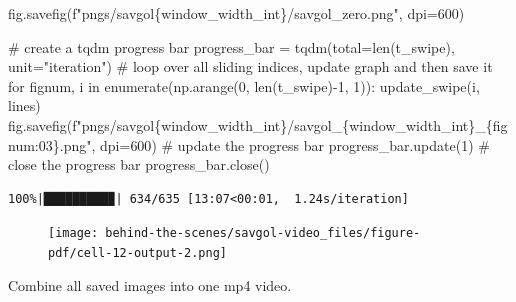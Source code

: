 \documentclass[
  letterpaper,
  DIV=11,
  numbers=noendperiod,
  oneside]{scrreprt}
\newenvironment{Shaded}{\begin{snugshade}}{\end{snugshade}}
\newcommand{\BuiltInTok}[1]{\textcolor[rgb]{0.00,0.23,0.31}{#1}}
\newcommand{\CommentTok}[1]{\textcolor[rgb]{0.37,0.37,0.37}{#1}}
\newcommand{\ControlFlowTok}[1]{\textcolor[rgb]{0.00,0.23,0.31}{#1}}
\newcommand{\DecValTok}[1]{\textcolor[rgb]{0.68,0.00,0.00}{#1}}
\newcommand{\KeywordTok}[1]{\textcolor[rgb]{0.00,0.23,0.31}{#1}}
\newcommand{\NormalTok}[1]{\textcolor[rgb]{0.00,0.23,0.31}{#1}}
\newcommand{\OperatorTok}[1]{\textcolor[rgb]{0.37,0.37,0.37}{#1}}
\newcommand{\SpecialCharTok}[1]{\textcolor[rgb]{0.37,0.37,0.37}{#1}}
\newcommand{\SpecialStringTok}[1]{\textcolor[rgb]{0.13,0.47,0.30}{#1}}
\newcommand{\StringTok}[1]{\textcolor[rgb]{0.13,0.47,0.30}{#1}}
\begin{document}
\begin{Shaded}
\begin{Highlighting}[]
\NormalTok{fig.savefig(}\SpecialStringTok{f"pngs/savgol}\SpecialCharTok{\{}\NormalTok{window\_width\_int}\SpecialCharTok{\}}\SpecialStringTok{/savgol\_zero.png"}\NormalTok{, dpi}\OperatorTok{=}\DecValTok{600}\NormalTok{)}

\CommentTok{\# create a tqdm progress bar}
\NormalTok{progress\_bar }\OperatorTok{=}\NormalTok{ tqdm(total}\OperatorTok{=}\BuiltInTok{len}\NormalTok{(t\_swipe), unit}\OperatorTok{=}\StringTok{"iteration"}\NormalTok{)}
\CommentTok{\# loop over all sliding indices, update graph and then save it}
\ControlFlowTok{for}\NormalTok{ fignum, i }\KeywordTok{in} \BuiltInTok{enumerate}\NormalTok{(np.arange(}\DecValTok{0}\NormalTok{, }\BuiltInTok{len}\NormalTok{(t\_swipe)}\OperatorTok{{-}}\DecValTok{1}\NormalTok{, }\DecValTok{1}\NormalTok{)):}
\NormalTok{    update\_swipe(i, lines)}
\NormalTok{    fig.savefig(}\SpecialStringTok{f"pngs/savgol}\SpecialCharTok{\{}\NormalTok{window\_width\_int}\SpecialCharTok{\}}\SpecialStringTok{/savgol\_}\SpecialCharTok{\{}\NormalTok{window\_width\_int}\SpecialCharTok{\}}\SpecialStringTok{\_}\SpecialCharTok{\{}\NormalTok{fignum}\SpecialCharTok{:03\}}\SpecialStringTok{.png"}\NormalTok{, dpi}\OperatorTok{=}\DecValTok{600}\NormalTok{)}
    \CommentTok{\# update the progress bar}
\NormalTok{    progress\_bar.update(}\DecValTok{1}\NormalTok{)}
\CommentTok{\# close the progress bar}
\NormalTok{progress\_bar.close()}
\end{Highlighting}
\end{Shaded}

\begin{verbatim}
100%|█████████▉| 634/635 [13:07<00:01,  1.24s/iteration]
\end{verbatim}

\begin{figure}[H]

{\centering \texttt{[image: behind-the-scenes/savgol-video\_files/figure-pdf/cell-12-output-2.png]}

}

\end{figure}

Combine all saved images into one mp4 video.
\end{document}
